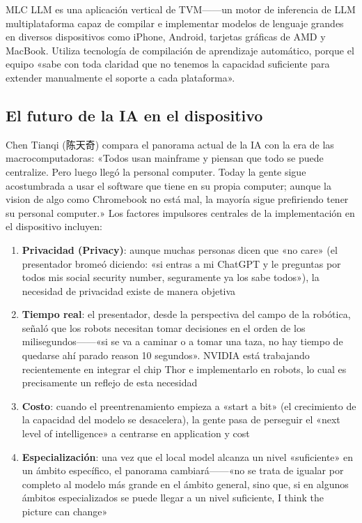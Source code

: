 \documentclass[a4paper]{article}
\begin{document}
MLC LLM es una aplicación vertical de TVM------un motor de inferencia de LLM multiplataforma capaz de compilar e implementar modelos de lenguaje grandes en diversos dispositivos como iPhone, Android, tarjetas gráficas de AMD y MacBook. Utiliza tecnología de compilación de aprendizaje automático, porque el equipo «sabe con toda claridad que no tenemos la capacidad suficiente para extender manualmente el soporte a cada plataforma».

\subsection{El futuro de la IA en el dispositivo}

Chen Tianqi (陈天奇) compara el panorama actual de la IA con la era de las macrocomputadoras: «Todos usan mainframe y piensan que todo se puede centralize. Pero luego llegó la personal computer. Today la gente sigue acostumbrada a usar el software que tiene en su propia computer; aunque la vision de algo como Chromebook no está mal, la mayoría sigue prefiriendo tener su personal computer.» Los factores impulsores centrales de la implementación en el dispositivo incluyen:

\begin{enumerate}
    \item \textbf{Privacidad (Privacy)}: aunque muchas personas dicen que «no care» (el presentador bromeó diciendo: «si entras a mi ChatGPT y le preguntas por todos mis social security number, seguramente ya los sabe todos»), la necesidad de privacidad existe de manera objetiva
    \item \textbf{Tiempo real}: el presentador, desde la perspectiva del campo de la robótica, señaló que los robots necesitan tomar decisiones en el orden de los milisegundos------«si se va a caminar o a tomar una taza, no hay tiempo de quedarse ahí parado reason 10 segundos». NVIDIA está trabajando recientemente en integrar el chip Thor e implementarlo en robots, lo cual es precisamente un reflejo de esta necesidad
    \item \textbf{Costo}: cuando el preentrenamiento empieza a «start a bit» (el crecimiento de la capacidad del modelo se desacelera), la gente pasa de perseguir el «next level of intelligence» a centrarse en application y cost
    \item \textbf{Especialización}: una vez que el local model alcanza un nivel «suficiente» en un ámbito específico, el panorama cambiará------«no se trata de igualar por completo al modelo más grande en el ámbito general, sino que, si en algunos ámbitos especializados se puede llegar a un nivel suficiente, I think the picture can change»
\end{enumerate}
\end{document}
